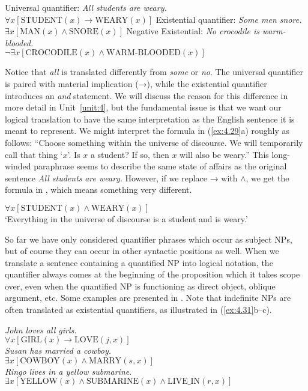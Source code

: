\ea \label{ex:4.29}
\ea  Universal quantifier: \textit{All students are weary.}\\
$\forall x [\text{STUDENT}(x) \rightarrow \text{WEARY}(x)]$
\ex  Existential quantifier: \textit{Some men snore.}\\
$\exists x[\text{MAN}(x) \wedge \text{SNORE}(x)]$
\ex  Negative Existential: \textit{No crocodile is warm-blooded.}\\
$\neg\exists x[\text{CROCODILE}(x) \wedge \text{WARM-BLOODED}(x)]$
\z \z

Notice that \textit{all} is translated differently from \textit{some} or \textit{no}. The universal quantifier is paired with material implication (→), while the existential quantifier introduces an \textit{and} statement. We will discuss the reason for this difference in more detail in Unit~\ref{unit:4}, but the fundamental issue is that we want our logical translation to have the same interpretation as the English sentence it is meant to represent. We might interpret the formula in (\ref{ex:4.29}a) roughly as follows: “Choose something within the universe of discourse. We will temporarily call that thing ‘$x$’. Is $x$ a student? If so, then $x$ will also be weary.” This long-winded paraphrase seems to describe the same state of affairs as the original sentence \textit{All students} \textit{are weary}. However, if we replace → with $\wedge$, we get the formula in , which means something very different.

\ea \label{ex:4.30}
$\forall x[\text{STUDENT}(x) \wedge \text{WEARY}(x)]$\\
‘Everything in the universe of discourse is a student and is weary.’
\z


So far we have only considered quantifier phrases which occur as subject NPs, but of course they can occur in other syntactic positions as well. When we translate a sentence containing a quantified NP into logical notation, the quantifier always comes at the beginning of the proposition which it takes scope over, even when the quantified NP is functioning as direct object, oblique argument, etc. Some examples are presented in . Note that indefinite NPs are often translated as existential quantifiers, as illustrated in (\ref{ex:4.31}b--c).


\ea \label{ex:4.31}
\ea \textit{John loves all girls.}\\
  $\forall x[\text{GIRL}(x) \rightarrow \text{LOVE}(j,x)]$\\
\ex \textit{Susan has married a cowboy.}\\
  $\exists x[\text{COWBOY}(x) \wedge \text{MARRY}(s,x)]$\\
\ex \textit{Ringo lives in a yellow submarine}.\\
  $\exists x[\text{YELLOW}(x) \wedge \text{SUBMARINE}(x) \wedge \text{LIVE\_IN}(r,x)]$
  \z
\z


